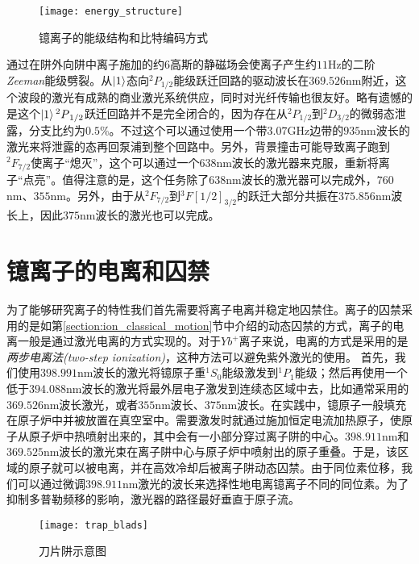 \begin{figure}
    \centering
    \caption[镱离子的能级结构和比特编码方式]{镱离子的能级结构和比特编码方式\label{fig:energy_structure}}
    \texttt{[image: energy\_structure]}
\end{figure}

通过在阱外向阱中离子施加的约$6$高斯的静磁场会使离子产生约$11$Hz的二阶\emph{Zeeman}能级劈裂。从$\ket{1}$态向$^2P_{1/2}$能级跃迁回路的驱动波长在$369.526$nm附近，这个波段的激光有成熟的商业激光系统供应，同时对光纤传输也很友好。略有遗憾的是这个$\ket{1}{^2P}_{1/2}$跃迁回路并不是完全闭合的，因为存在从$^2P_{1/2}$到$^2D_{3/2}$的微弱态泄露，分支比约为$0.5$\%\cite[]{Olmschenk_Younge_Moehring_Matsukevich_Maunz_Monroe_2007}。不过这个可以通过使用一个带$3.07$GHz边带的$935$nm波长的激光来将泄露的态再回泵浦到整个回路中。另外，背景撞击可能导致离子跑到$^2F_{7/2}$使离子“熄灭”，这个可以通过一个$638$nm波长的激光器来克服，重新将离子“点亮”。值得注意的是，这个任务除了$638$nm波长的激光器可以完成外，$760$nm\cite[]{Huntemann_Okhapkin_Lipphardt_Weyers_Tamm_Peik_2012}、$355$nm\cite[]{Senko_2014}。另外，由于从$^2F_{7/2}$到$^3F[1/2]_{3/2}$的跃迁大部分共振在$375.856$nm波长上，因此$375$nm波长的激光也可以完成。

\section[镱离子的电离和囚禁]{镱离子的电离和囚禁}
为了能够研究离子的特性我们首先需要将离子电离并稳定地囚禁住。离子的囚禁采用的是如第\ref{section:ion_classical_motion}节中介绍的动态囚禁的方式，离子的电离一般是通过激光电离的方式实现的。对于$Yb^+$离子来说，电离的方式是采用的是\emph{两步电离法(two-step ionization)}\cite[]{Olmschenk_Younge_Moehring_Matsukevich_Maunz_Monroe_2007}，这种方法可以避免紫外激光的使用。
首先，我们使用$398.991$nm波长的激光将镱原子重$^1S_0$能级激发到$^1P_1$能级；然后再使用一个低于$394.088$nm波长的激光将最外层电子激发到连续态区域中去，比如通常采用的$369.526$nm波长激光，或者$355$nm波长、$375$nm波长。在实践中，镱原子一般填充在原子炉中并被放置在真空室中。需要激发时就通过施加恒定电流加热原子，使原子从原子炉中热喷射出来的，其中会有一小部分穿过离子阱的中心。$398.911$nm和$369.525$nm波长的激光束在离子阱中心与原子炉中喷射出的原子重叠。于是，该区域的原子就可以被电离，并在高效冷却后被离子阱动态囚禁。由于同位素位移，我们可以通过微调$398.911$nm激光的波长来选择性地电离镱离子不同的同位素。为了抑制多普勒频移的影响，激光器的路径最好垂直于原子流。

\begin{figure}
    \centering
    \caption[刀片阱示意图]{刀片阱示意图\label{fig:trap_blads}}
    \texttt{[image: trap\_blads]}
\end{figure}

